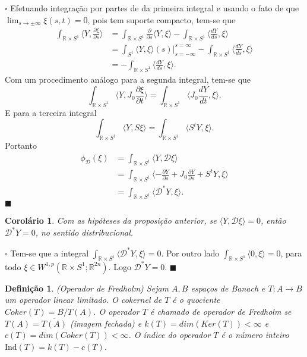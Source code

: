 \documentclass[12pt]{book}
\newtheorem{corolario}[teorema]{Corolário}
\newtheorem{definicao}[teorema]{Definição}
\newenvironment{prova}[1]{$\square$ #1}{\hfill$\blacksquare$}
\newcommand{\circulo}{S^{1}}
\newcommand{\diferencialfloerabrev}{\mathcal{D}}
\newcommand{\derivada}[2]{\frac{d #1}{d #2}}
\newcommand{\derivadaparcial}[2]{\frac{\partial #1}{\partial #2}}
\newcommand{\espacosobolevcontradominio}[2]{W^{1,p}(#1;#2)}
\newcommand{\espacosobolevretacirculo}{\espacosobolevcontradominio{\retacartesianocirculo}{\real{2n}}}
\newcommand{\estruturacomplexa}{J_{0}}
\newcommand{\ind}{\text{Ind}}
\newcommand{\produtointerno}[2]{\langle #1, #2 \rangle}
\newcommand{\retacartesianocirculo}{\real{} \times \circulo}
\newcommand{\real}[1]{\mathbb{R}^{#1}}
\begin{document}
\begin{prova}
		Efetuando integração por partes de da primeira integral e usando o fato de que $\lim_{s\to \pm \infty}\xi(s,t) = 0$, pois tem suporte compacto, tem-se que
		$$
		\begin{aligned}
		\int_{\retacartesianocirculo}\produtointerno{Y}{\derivadaparcial{\xi}{s}}
		&=\int_{\retacartesianocirculo}\derivadaparcial{}{s}\produtointerno{Y}{\xi} - \int_{\retacartesianocirculo}\produtointerno{\derivada{Y}{s}}{\xi} 
		\\
		&=\int_{\circulo}\produtointerno{Y}{\xi}(s)\Big|_{s=-\infty}^{s=\infty} -\int_{\retacartesianocirculo}\produtointerno{\derivada{Y}{s}}{\xi}
		\\
		&=-\int_{\retacartesianocirculo}\produtointerno{\derivada{Y}{s}}{\xi}.
		\end{aligned}
		$$
		Com um procedimento análogo para a segunda integral, tem-se que
		$$
		\int_{\retacartesianocirculo}\produtointerno{Y}{\estruturacomplexa\derivadaparcial{\xi}{t}} = \int_{\retacartesianocirculo}\produtointerno{\estruturacomplexa \derivada{Y}{t}}{\xi}.
		$$
		E para a terceira integral
		$$
		\int_{\retacartesianocirculo}\produtointerno{Y}{S\xi}= \int_{\retacartesianocirculo}\produtointerno{S^{t}Y}{\xi}.
		$$
		Portanto
		$$
		\begin{aligned}
		\phi_{\diferencialfloerabrev}(\xi) 
		&= \int_{\retacartesianocirculo}\produtointerno{Y}{\diferencialfloerabrev\xi}
		\\
		&=
		\int_{\retacartesianocirculo}\produtointerno{-\derivadaparcial{Y}{s}+\estruturacomplexa \derivadaparcial{Y}{s} + S^{t}Y}{\xi}
		\\
		&=\int_{\retacartesianocirculo}\produtointerno{\diferencialfloerabrev^{*}Y}{\xi}.
		\end{aligned}
		$$
	\end{prova}
	
	\begin{corolario}
		Com as hipóteses da proposição anterior, se $\produtointerno{Y}{\diferencialfloerabrev\xi} = 0$, então $\diferencialfloerabrev^{*}Y = 0$, no sentido distribucional.
	\end{corolario}
	\begin{prova}
		Tem-se que a integral $\int_{\retacartesianocirculo}\produtointerno{\diferencialfloerabrev^{*}Y}{\xi}=0$. Por outro lado $ \int_{\retacartesianocirculo}\produtointerno{0}{\xi} =0$, para todo $\xi \in \espacosobolevretacirculo$. Logo $\diferencialfloerabrev^{*}Y = 0$.
	\end{prova}
	
	\begin{definicao}\label{definicao_operador_fredholm}
		(Operador de Fredholm) Sejam $A, B$ espaços de Banach e $T: A\to B$ um operador linear limitado. O cokernel de $T$ é o quociente $Coker(T)=B/T(A)$. O operador $T$ é chamado de operador de Fredholm se $T(A)=\overline{T(A)}$ (imagem fechada) e $k(T) = dim(Ker(T)) < \infty$ e $c(T)=dim(Coker(T)) < \infty$. O índice do operador $T$ é o número inteiro $\ind(T) = k(T) - c(T)$. 
	\end{definicao}
	
\end{document}
